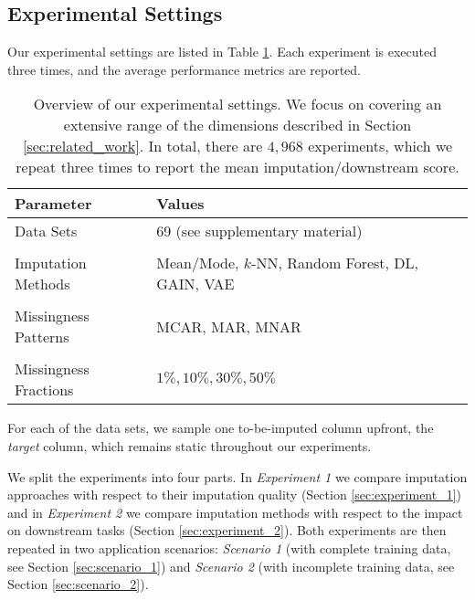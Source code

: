 \subsection{Experimental Settings}
%
Our experimental settings are listed in Table \ref{tab:experiment_settings}. Each experiment is executed three times, and the average performance metrics are reported.
%
\begin{table}
	\centering
	\begin{tabular}{ll}
		\toprule
		Parameter            & Values                                     \\ \midrule
		Data Sets             & 69 (see supplementary material)    \\
		\\[-0.5em]
		Imputation Methods              & Mean/Mode, $k$-NN, Random Forest, DL, GAIN, VAE \\
		\\[-0.5em]
		Missingness Patterns  & MCAR, MAR, MNAR                            \\
		\\[-0.5em]
		Missingness Fractions & $1\%, 10\%, 30\%, 50\%$                      \\ \bottomrule
	\end{tabular}
	\caption{Overview of our experimental settings. We focus on covering an extensive range of the dimensions described in Section \ref{sec:related_work}. In total, there are $4,968$ experiments, which we repeat three times to report the mean imputation/downstream score.}
	\label{tab:experiment_settings}
\end{table}
%
For each of the data sets, we sample one to-be-imputed column upfront, the \emph{target} column, which remains static throughout our experiments.

We split the experiments into four parts. In \emph{Experiment 1} we compare imputation approaches with respect to their imputation quality (Section \ref{sec:experiment_1}) and in \emph{Experiment 2} we compare imputation methods with respect to the impact on downstream tasks (Section \ref{sec:experiment_2}). Both experiments are then repeated in two application scenarios: \emph{Scenario 1} (with complete training data, see Section \ref{sec:scenario_1}) and \emph{Scenario 2} (with incomplete training data, see Section \ref{sec:scenario_2}).

